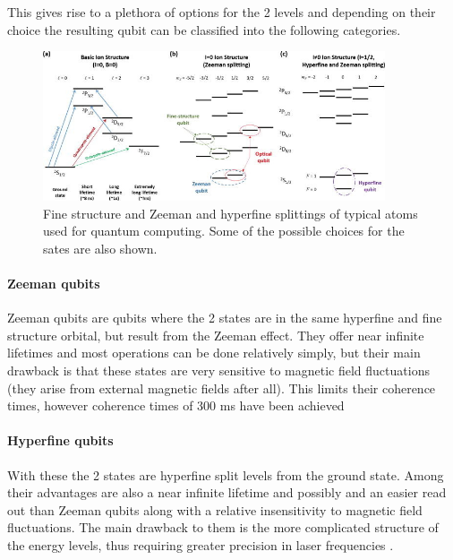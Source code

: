 This gives rise to a plethora of options for the 2 levels and depending on their choice the resulting qubit can be classified into the following categories.


\begin{figure}[H]
    \centering
    \includegraphics[width=0.9\textwidth]{images/TIQC_levels.jpeg}
    \caption{Fine structure and Zeeman and hyperfine splittings of typical atoms used for quantum computing. Some of the possible choices for the sates are also shown.}\label{fig:TIQC_levels}
\end{figure}

\paragraph{Zeeman qubits}
Zeeman qubits are qubits where the 2 states are in the same hyperfine and fine structure orbital, but result from the Zeeman effect.
They offer near infinite lifetimes and most operations can be done relatively simply, but their main drawback is that these states are very sensitive to magnetic field fluctuations (they arise from external magnetic fields after all).
This limits their coherence times, however coherence times of 300 ms have been achieved \cite{rusterLonglivedZeemanTrappedion2016}

\paragraph{Hyperfine qubits}
With these the 2 states are hyperfine split levels from the ground state.
Among their advantages are also a near infinite lifetime and possibly and an easier read out than Zeeman qubits along with a relative insensitivity to magnetic field fluctuations.
The main drawback to them is the more complicated structure of the energy levels, thus requiring greater precision in laser frequencies \cite{bruzewiczTrappedionQuantumComputing2019}.


